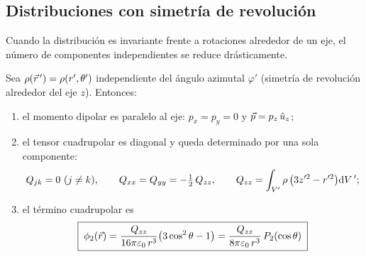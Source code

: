 \subsection{Distribuciones con simetría de revolución}\label{sec:revolucion}
Cuando la distribución es invariante frente a rotaciones alrededor de un eje, el número de componentes independientes se reduce drásticamente.

\begin{teorema}\label{teo:revolucion}
Sea $\rho(\vec{r}\,')=\rho(r',\theta')$ independiente del ángulo azimutal $\varphi'$ (simetría de revolución alrededor del eje $z$). Entonces:
\begin{enumerate}[label=(\roman*)]
  \item el momento dipolar es paralelo al eje: $p_x=p_y=0$ y $\vec{p}=p_z\,\hat{u}_{z}$;
  \item el tensor cuadrupolar es diagonal y queda determinado por una sola componente:
        \begin{equation}\label{eq:Q-revolucion}
          Q_{jk}=0\ (j\neq k),\qquad Q_{xx}=Q_{yy}=-\tfrac12\,Q_{zz},\qquad Q_{zz}=\int_{V'}\rho\,\bigl(3z'^{2}-r'^{2}\bigr)\mathrm{d} V\,' ;
        \end{equation}
  \item el término cuadrupolar es
        \begin{equation}\label{eq:cuadrupolar-revolucion}
          \boxed{\;\phi_{2}(\vec{r})=\frac{Q_{zz}}{16\pi\varepsilon_{0}\,r^{3}}\bigl(3\cos^{2}\theta-1\bigr)=\frac{Q_{zz}}{8\pi\varepsilon_{0}\,r^{3}}\,P_{2}(\cos\theta)\;}
        \end{equation}
\end{enumerate}
\end{teorema}
